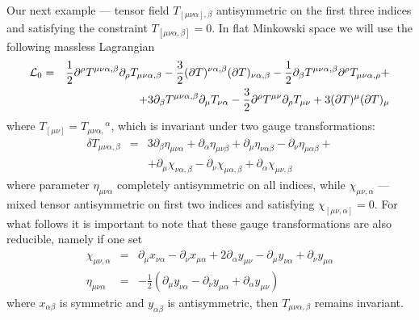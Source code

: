 \documentclass[a4paper,12pt]{article}
\begin{document}
Our next example --- tensor field $T_{[\mu\nu\alpha],\beta}$
antisymmetric on the first three indices and satisfying the
constraint $T_{[\mu\nu\alpha,\beta]} = 0$. In flat Minkowski space
we will use the following massless Lagrangian
\begin{eqnarray}
{\cal L}_0 &=& \frac{1}{2} \partial^\rho T^{\mu\nu\alpha,\beta} \partial_\rho
T_{\mu\nu\alpha,\beta} - \frac{3}{2} (\partial T)^{\nu\alpha,\beta}
(\partial T)_{\nu\alpha,\beta} - \frac{1}{2} \partial_\beta
T^{\mu\nu\alpha,\beta} \partial^\rho T_{\mu\nu\alpha,\rho} + \nonumber \\
 && + 3 \partial_\beta T^{\mu\nu\alpha,\beta} \partial_\mu T_{\nu\alpha}
 - \frac{3}{2} \partial^\rho T^{\mu\nu} \partial_\rho T_{\mu\nu} +
 3 (\partial T)^\mu (\partial T)_\mu
\end{eqnarray}
where $T_{[\mu\nu]} = T_{\mu\nu\alpha,}{}^\alpha$, which is invariant
under two gauge transformations:
\begin{eqnarray}
\delta T_{\mu\nu\alpha,\beta} &=& 3 \partial_\beta \eta_{\mu\nu\alpha}
+ \partial_\alpha \eta_{\mu\nu\beta} + \partial_\mu \eta_{\nu\alpha\beta}
- \partial_\nu \eta_{\mu\alpha\beta} + \nonumber \\
 && + \partial_\mu \chi_{\nu\alpha,\beta} - \partial_\nu
\chi_{\mu\alpha,\beta} + \partial_\alpha \chi_{\mu\nu,\beta}
\end{eqnarray}
where parameter $\eta_{\mu\nu\alpha}$ completely antisymmetric on all
indices, while $\chi_{\mu\nu,\alpha}$ --- mixed tensor
antisymmetric on first two indices and satisfying $\chi_{[\mu\nu,\alpha]}
= 0$. For what follows it is important to note that these gauge
transformations are also reducible, namely if one set
\begin{eqnarray}
\chi_{\mu\nu,\alpha} &=& \partial_\mu x_{\nu\alpha} - \partial_\nu
x_{\mu\alpha} + 2 \partial_\alpha y_{\mu\nu} - \partial_\mu y_{\nu\alpha}
+ \partial_\nu y_{\mu\alpha} \nonumber \\
\eta_{\mu\nu\alpha} &=& - \frac{1}{2} (\partial_\mu y_{\nu\alpha} - \partial_\nu
y_{\mu\alpha} + \partial_\alpha y_{\mu\nu})
\end{eqnarray}
where $x_{\alpha\beta}$ is symmetric and $y_{\alpha\beta}$ is antisymmetric,
then $T_{\mu\nu\alpha,\beta}$ remains invariant.
\end{document}
